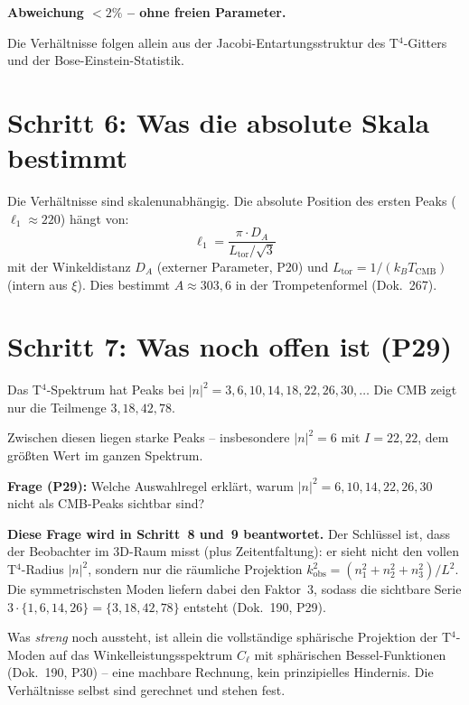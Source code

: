 \textbf{Abweichung $< 2\%$ -- ohne freien Parameter.}

Die Verhältnisse folgen allein aus der Jacobi-Entartungsstruktur
des T$^4$-Gitters und der Bose-Einstein-Statistik.

\section{Schritt 6: Was die absolute Skala bestimmt}

Die Verhältnisse sind skalenunabhängig. Die absolute Position
des ersten Peaks ($\ell_1 \approx 220$) hängt von:
\[
  \ell_1 = \frac{\pi \cdot D_A}{L_\mathrm{tor} / \sqrt{3}}
\]
mit der Winkeldistanz $D_A$ (externer Parameter, P20) und
$L_\mathrm{tor} = 1/(k_B T_\mathrm{CMB})$ (intern aus $\xi$).
Dies bestimmt $A \approx 303{,}6$ in der Trompetenformel (Dok.~267).

\section{Schritt 7: Was noch offen ist (P29)}

Das T$^4$-Spektrum hat Peaks bei $|n|^2 = 3, 6, 10, 14, 18, 22, 26, 30, \ldots$
Die CMB zeigt nur die Teilmenge $3, 18, 42, 78$.

Zwischen diesen liegen starke Peaks -- insbesondere $|n|^2 = 6$ mit
$I = 22{,}22$, dem größten Wert im ganzen Spektrum.

\textbf{Frage (P29):} Welche Auswahlregel erklärt, warum
$|n|^2 = 6, 10, 14, 22, 26, 30$ nicht als CMB-Peaks sichtbar sind?

\textbf{Diese Frage wird in Schritt~8 und~9 beantwortet.} Der Schlüssel
ist, dass der Beobachter im 3D-Raum misst (plus Zeitentfaltung): er sieht
nicht den vollen T$^4$-Radius $|n|^2$, sondern nur die räumliche Projektion
$k_\mathrm{obs}^2 = (n_1^2 + n_2^2 + n_3^2)/L^2$. Die symmetrischsten Moden
liefern dabei den Faktor~3, sodass die sichtbare Serie
$3\cdot\{1,6,14,26\} = \{3,18,42,78\}$ entsteht (Dok.~190, P29).

Was \emph{streng} noch aussteht, ist allein die vollständige sphärische
Projektion der T$^4$-Moden auf das Winkelleistungsspektrum $C_\ell$ mit
sphärischen Bessel-Funktionen (Dok.~190, P30) -- eine machbare Rechnung,
kein prinzipielles Hindernis. Die Verhältnisse selbst sind gerechnet
und stehen fest.

